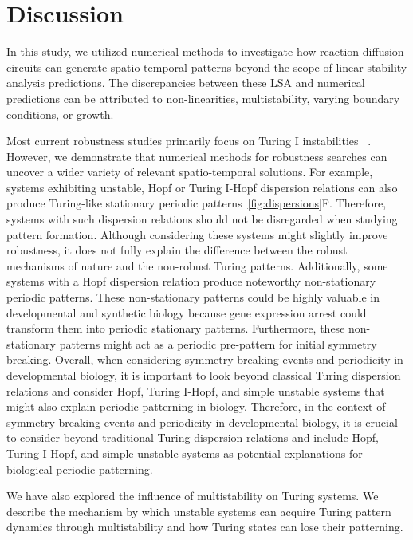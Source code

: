 \section{Discussion}

In this study, we utilized numerical methods to investigate how reaction-diffusion circuits can generate spatio-temporal patterns beyond the scope of linear stability analysis predictions.
The discrepancies between these LSA and numerical predictions can be attributed to non-linearities, multistability, varying boundary conditions, or growth.

Most current robustness studies primarily focus on Turing I instabilities ~\parencite{Scholes2019, Zheng2016, Marcon}.
However, we demonstrate that numerical methods for robustness searches can uncover a wider variety of relevant spatio-temporal solutions.
For example, systems exhibiting unstable, Hopf or Turing I-Hopf dispersion relations can also produce Turing-like stationary periodic patterns~\ref{fig:dispersions}F.
Therefore, systems with such dispersion relations should not be disregarded when studying pattern formation.
Although considering these systems might slightly improve robustness, it does not fully explain the difference between the robust mechanisms of nature and the non-robust Turing patterns.
Additionally, some systems with a Hopf dispersion relation produce noteworthy non-stationary periodic patterns.
These non-stationary patterns could be highly valuable in developmental and synthetic biology because gene expression arrest could transform them into periodic stationary patterns.
Furthermore, these non-stationary patterns might act as a periodic pre-pattern for initial symmetry breaking.
Overall, when considering symmetry-breaking events and periodicity in developmental biology, it is important to look beyond classical Turing dispersion relations and consider Hopf, Turing I-Hopf, and simple unstable systems that might also explain periodic patterning in biology.
Therefore, in the context of symmetry-breaking events and periodicity in developmental biology, it is crucial to consider beyond traditional Turing dispersion relations and include Hopf, Turing I-Hopf, and simple unstable systems as potential explanations for biological periodic patterning.

We have also explored the influence of multistability on Turing systems.
We describe the mechanism by which unstable systems can acquire Turing pattern dynamics through multistability and how Turing states can lose their patterning.

